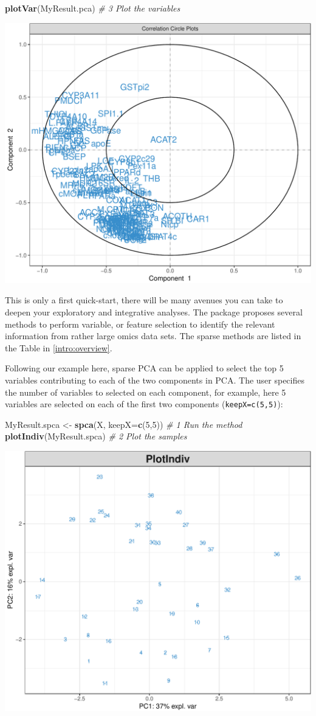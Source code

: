 \documentclass[]{book}
\newenvironment{Shaded}{\begin{snugshade}}{\end{snugshade}}
\newcommand{\CommentTok}[1]{\textcolor[rgb]{0.56,0.35,0.01}{\textit{#1}}}
\newcommand{\DataTypeTok}[1]{\textcolor[rgb]{0.13,0.29,0.53}{#1}}
\newcommand{\DecValTok}[1]{\textcolor[rgb]{0.00,0.00,0.81}{#1}}
\newcommand{\KeywordTok}[1]{\textcolor[rgb]{0.13,0.29,0.53}{\textbf{#1}}}
\newcommand{\NormalTok}[1]{#1}
\newcommand{\StringTok}[1]{\textcolor[rgb]{0.31,0.60,0.02}{#1}}
\begin{document}
\begin{Shaded}
\begin{Highlighting}[]
\KeywordTok{plotVar}\NormalTok{(MyResult.pca)   }\CommentTok{# 3 Plot the variables}
\end{Highlighting}
\end{Shaded}

\begin{center}\includegraphics[width=0.5\linewidth,]{Figures/02-pca-nutrimouse-2} \end{center}

This is only a first quick-start, there will be many avenues you can take to deepen your exploratory and integrative analyses. The package proposes several methods to perform variable, or feature selection to identify the relevant information from rather large omics data sets. The sparse methods are listed in the Table in \ref{intro:overview}.

Following our example here, sparse PCA can be applied to select the top 5 variables contributing to each of the two components in PCA. The user specifies the number of variables to selected on each component, for example, here 5 variables are selected on each of the first two components (\texttt{keepX=c(5,5)}):

\begin{Shaded}
\begin{Highlighting}[]
\NormalTok{MyResult.spca <-}\StringTok{ }\KeywordTok{spca}\NormalTok{(X, }\DataTypeTok{keepX=}\KeywordTok{c}\NormalTok{(}\DecValTok{5}\NormalTok{,}\DecValTok{5}\NormalTok{)) }\CommentTok{# 1 Run the method}
\KeywordTok{plotIndiv}\NormalTok{(MyResult.spca)               }\CommentTok{# 2 Plot the samples}
\end{Highlighting}
\end{Shaded}

\begin{center}\includegraphics[width=0.5\linewidth,]{Figures/02-spca-nutrimouse-1} \end{center}
\end{document}
